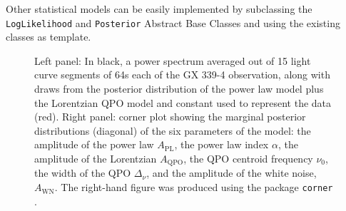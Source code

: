 \documentclass[twocolumn]{aastex62}
\begin{document}
Other statistical models can be easily implemented by subclassing the \texttt{LogLikelihood} and \texttt{Posterior} Abstract Base Classes and using the existing classes as template.

\begin{figure}[htbp]
\begin{center}
\caption{Left panel: In black, a power spectrum averaged out of 15 light curve segments of 64s each of the GX 339-4 observation, along with draws from the posterior distribution of the power law model plus the Lorentzian QPO model and constant used to represent the data (red). Right panel: corner plot showing the marginal posterior distributions (diagonal) of the six parameters of the model: the amplitude of the power law $A_\mathrm{PL}$, the power law index $\alpha$, the amplitude of the Lorentzian $A_\mathrm{QPO}$, the QPO centroid frequency $\nu_0$, the width of the QPO $\Delta_\nu$, and the amplitude of the white noise, $A_\mathrm{WN}$. The right-hand figure was produced using the package \texttt{corner} \citep{corner}.}
\label{fig:posterior}
\end{center}
\end{figure}
\end{document}
